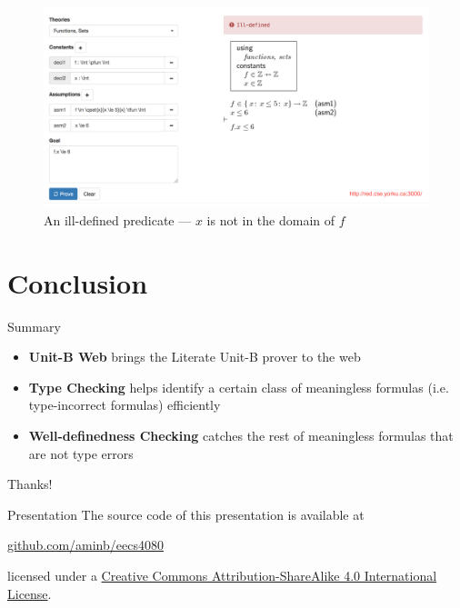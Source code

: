 \documentclass[10pt]{beamer}
\newcommand{\unitb}{Unit-B\xspace}
\begin{document}
\begin{frame}[plain]
  \begin{figure}
    \centering
    \includegraphics[width=\textwidth]{img/unitb_wd.png}
    \caption{An ill-defined predicate --- $x$ is not in
                  the domain of $f$}\label{fig:wd}
  \end{figure}
\end{frame}


\section{Conclusion}

\begin{frame}{Summary}

  \begin{itemize}[<+->]
  \item \textbf{\unitb Web} brings the Literate Unit-B prover to the web
  \item \textbf{Type Checking} helps identify a certain class of
    meaningless formulas (i.e. type-incorrect formulas) efficiently
  \item \textbf{Well-definedness Checking} catches the rest of
    meaningless formulas that are not type errors
  \end{itemize}

\end{frame}

\begin{frame}[standout]
  Thanks!
\end{frame}

\appendix

\begin{frame}[fragile]{Presentation}
  The source code of this presentation is available at

  \begin{center}
    \href{https://github.com/aminb/eecs4080}{\url{github.com/aminb/eecs4080}}
  \end{center}

  licensed under a
  \href{http://creativecommons.org/licenses/by-sa/4.0/}{Creative Commons
  Attribution-ShareAlike 4.0 International License}.

  \begin{center}\ccbysa\end{center}
\end{frame}
\end{document}
